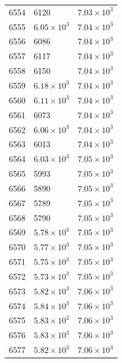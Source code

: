\begin{table}[H]
\begin{tabular}{lll}
6554 & 6120 & $\displaystyle 7.03 \times 10^{3}$ \\
6555 & $\displaystyle 6.05 \times 10^{3}$ & $\displaystyle 7.04 \times 10^{3}$ \\
6556 & 6086 & $\displaystyle 7.04 \times 10^{3}$ \\
6557 & 6117 & $\displaystyle 7.04 \times 10^{3}$ \\
6558 & 6150 & $\displaystyle 7.04 \times 10^{3}$ \\
6559 & $\displaystyle 6.18 \times 10^{3}$ & $\displaystyle 7.04 \times 10^{3}$ \\
6560 & $\displaystyle 6.11 \times 10^{3}$ & $\displaystyle 7.04 \times 10^{3}$ \\
6561 & 6073 & $\displaystyle 7.04 \times 10^{3}$ \\
6562 & $\displaystyle 6.06 \times 10^{3}$ & $\displaystyle 7.04 \times 10^{3}$ \\
6563 & 6013 & $\displaystyle 7.04 \times 10^{3}$ \\
6564 & $\displaystyle 6.03 \times 10^{3}$ & $\displaystyle 7.05 \times 10^{3}$ \\
6565 & 5993 & $\displaystyle 7.05 \times 10^{3}$ \\
6566 & 5890 & $\displaystyle 7.05 \times 10^{3}$ \\
6567 & 5789 & $\displaystyle 7.05 \times 10^{3}$ \\
6568 & 5790 & $\displaystyle 7.05 \times 10^{3}$ \\
6569 & $\displaystyle 5.78 \times 10^{3}$ & $\displaystyle 7.05 \times 10^{3}$ \\
6570 & $\displaystyle 5.77 \times 10^{3}$ & $\displaystyle 7.05 \times 10^{3}$ \\
6571 & $\displaystyle 5.75 \times 10^{3}$ & $\displaystyle 7.05 \times 10^{3}$ \\
6572 & $\displaystyle 5.73 \times 10^{3}$ & $\displaystyle 7.05 \times 10^{3}$ \\
6573 & $\displaystyle 5.82 \times 10^{3}$ & $\displaystyle 7.06 \times 10^{3}$ \\
6574 & $\displaystyle 5.84 \times 10^{3}$ & $\displaystyle 7.06 \times 10^{3}$ \\
6575 & $\displaystyle 5.83 \times 10^{3}$ & $\displaystyle 7.06 \times 10^{3}$ \\
6576 & $\displaystyle 5.83 \times 10^{3}$ & $\displaystyle 7.06 \times 10^{3}$ \\
6577 & $\displaystyle 5.82 \times 10^{3}$ & $\displaystyle 7.06 \times 10^{3}$ \\

\end{tabular}
\end{table}
